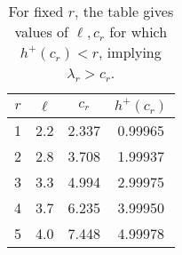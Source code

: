 \documentclass[oneside]{amsart}
\begin{document}
\begin{table}[h]
\centering
\begin{tabular}{ |c|c|c|c| } 
 \hline
$r$	&	$\ell$	&	$c_r$ 	&	$h^+(c_r)$\\ 
\hline
1	& 	2.2		&	2.337	&	0.99965\\
2	&	2.8		&	3.708	&	1.99937\\
3	&	3.3		&	4.994	&	2.99975\\
4	&	3.7		&	6.235	&	3.99950\\
5	&	4.0		&	7.448	&	4.99978\\
 \hline
\end{tabular}
\caption{For fixed $r$, the table gives values of $\ell,c_r$ for which $h^+(c_r) < r$, implying $\lambda_r > c_r$.}
\label{figure: table example}
\end{table}
\end{document}
